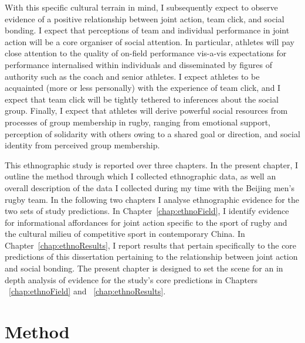 \begin{CJK}{UTF8}{gbsn}
With this specific cultural terrain in mind, I subsequently expect to observe evidence of a positive relationship between joint action, team click, and social bonding.  I expect that perceptions of team and individual performance in joint action will be a core organiser of social attention.  In particular, athletes will pay close attention to
the quality of on-field performance vis-a-vis expectations for performance internalised within individuals and disseminated by figures of authority such as the coach and senior athletes.  I expect athletes to be acquainted (more or less personally) with the experience of team click, and I expect that team click will be tightly tethered to inferences about the social group.  Finally, I expect that athletes will derive powerful social resources from processes of group membership in rugby, ranging from emotional support, perception of solidarity with others owing to a shared goal or direction, and social identity from perceived group membership.


This ethnographic study is reported over three chapters.  In the present chapter, I outline the method through which I collected ethnographic data, as well an overall description of the data I collected during my time with the Beijing men's rugby team.  In the following two chapters I analyse ethnographic evidence for the two sets of study predictions.  In Chapter~\ref{chap:ethnoField}, I identify evidence for informational affordances for joint action specific to the sport of rugby and the cultural milieu of competitive sport in contemporary China.  In Chapter~\ref{chap:ethnoResults}, I report results that pertain specifically to the core predictions of this dissertation pertaining to the relationship between joint action and social bonding.  The present chapter is designed to set the scene for an in depth analysis of evidence for the study's core predictions in Chapters ~\ref{chap:ethnoField} and ~\ref{chap:ethnoResults}.







\section{Method}


\end{CJK}
